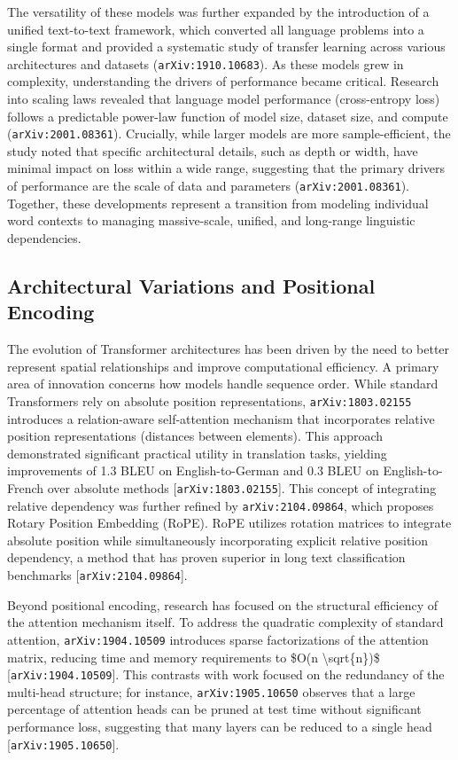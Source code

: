 \documentclass[11pt]{article}
\begin{document}
The versatility of these models was further expanded by the introduction of a unified text-to-text framework, which converted all language problems into a single format and provided a systematic study of transfer learning across various architectures and datasets (\texttt{arXiv:1910.10683}). As these models grew in complexity, understanding the drivers of performance became critical. Research into scaling laws revealed that language model performance (cross-entropy loss) follows a predictable power-law function of model size, dataset size, and compute (\texttt{arXiv:2001.08361}). Crucially, while larger models are more sample-efficient, the study noted that specific architectural details, such as depth or width, have minimal impact on loss within a wide range, suggesting that the primary drivers of performance are the scale of data and parameters (\texttt{arXiv:2001.08361}). Together, these developments represent a transition from modeling individual word contexts to managing massive-scale, unified, and long-range linguistic dependencies.

\subsection{Architectural Variations and Positional Encoding}

The evolution of Transformer architectures has been driven by the need to better represent spatial relationships and improve computational efficiency. A primary area of innovation concerns how models handle sequence order. While standard Transformers rely on absolute position representations, \texttt{arXiv:1803.02155} introduces a relation-aware self-attention mechanism that incorporates relative position representations (distances between elements). This approach demonstrated significant practical utility in translation tasks, yielding improvements of 1.3 BLEU on English-to-German and 0.3 BLEU on English-to-French over absolute methods [\texttt{arXiv:1803.02155}]. This concept of integrating relative dependency was further refined by \texttt{arXiv:2104.09864}, which proposes Rotary Position Embedding (RoPE). RoPE utilizes rotation matrices to integrate absolute position while simultaneously incorporating explicit relative position dependency, a method that has proven superior in long text classification benchmarks [\texttt{arXiv:2104.09864}].

Beyond positional encoding, research has focused on the structural efficiency of the attention mechanism itself. To address the quadratic complexity of standard attention, \texttt{arXiv:1904.10509} introduces sparse factorizations of the attention matrix, reducing time and memory requirements to \$O(n \textbackslash{}sqrt\{n\})\$ [\texttt{arXiv:1904.10509}]. This contrasts with work focused on the redundancy of the multi-head structure; for instance, \texttt{arXiv:1905.10650} observes that a large percentage of attention heads can be pruned at test time without significant performance loss, suggesting that many layers can be reduced to a single head [\texttt{arXiv:1905.10650}].
\end{document}
